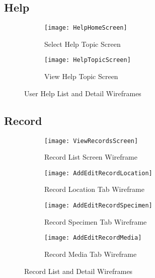 \documentclass[
10pt, %
a4paper, %
oneside, %
headinclude,footinclude, %
BCOR5mm, %
]{scrartcl}
\begin{document}
\begin{appendices}
\subsection{Help} %
\label{sub:help}

\begin{figure}[h]
\centering
\begin{subfigure}{.5\columnwidth}
  \centering
  \texttt{[image: HelpHomeScreen]}
  \caption{Select Help Topic Screen}
  \label{wire:help_home}
\end{subfigure}%
\begin{subfigure}{.5\columnwidth}
  \centering
  \texttt{[image: HelpTopicScreen]}
  \caption{View Help Topic Screen}
  \label{wire:help_topic}
\end{subfigure}
\caption{User Help List and Detail Wireframes}
\label{wire:help}
\end{figure}


\newpage

\subsection{Record} %
\label{sub:record}

\begin{figure}[h]
\centering
\begin{subfigure}[b]{.475\textwidth}
  \centering
  \texttt{[image: ViewRecordsScreen]}
  \caption{Record List Screen Wireframe}
  \label{wire:records_list}
\end{subfigure}
\begin{subfigure}[b]{.475\textwidth}
  \centering
  \texttt{[image: AddEditRecordLocation]}
  \caption{Record Location Tab Wireframe}
  \label{wire:record_loc}
\end{subfigure}
\quad
\begin{subfigure}[b]{.475\textwidth}
  \centering
  \texttt{[image: AddEditRecordSpecimen]}
  \caption{Record Specimen Tab Wireframe}
  \label{wire:record_specimen}
\end{subfigure}
\begin{subfigure}[b]{.475\textwidth}
  \centering
  \texttt{[image: AddEditRecordMedia]}
  \caption{Record Media Tab Wireframe}
  \label{wire:record_media}
\end{subfigure}
\caption{Record List and Detail Wireframes}
\label{wire:help}
\end{figure}



\end{appendices}
\end{document}
